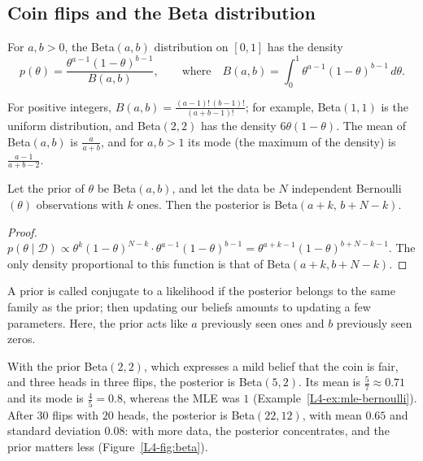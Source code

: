 \subsection{Coin flips and the Beta distribution}

\begin{definition}\label{L4-def:beta}
    For $a, b > 0$, the Beta$(a, b)$ distribution on $[0, 1]$ has the density
    \[p(\theta) = \frac{\theta^{a-1}(1 - \theta)^{b-1}}{B(a, b)}, \qquad \text{where} \quad B(a, b) = \int_0^1 \theta^{a-1}(1 - \theta)^{b-1} \, d\theta.\]
\end{definition}

For positive integers, $B(a, b) = \frac{(a - 1)!\,(b - 1)!}{(a + b - 1)!}$; for example, Beta$(1, 1)$ is the uniform distribution, and Beta$(2, 2)$ has the density $6\theta(1 - \theta)$. The mean of Beta$(a, b)$ is $\frac{a}{a + b}$, and for $a, b > 1$ its mode (the maximum of the density) is $\frac{a - 1}{a + b - 2}$.

\begin{theorem}\label{L4-thm:beta-bernoulli}
    Let the prior of $\theta$ be Beta$(a, b)$, and let the data be $N$ independent Bernoulli$(\theta)$ observations with $k$ ones. Then the posterior is Beta$(a + k, \, b + N - k)$.
\end{theorem}

\begin{proof}
    $p(\theta \mid \mathcal{D}) \propto \theta^k(1 - \theta)^{N-k} \cdot \theta^{a-1}(1 - \theta)^{b-1} = \theta^{a + k - 1}(1 - \theta)^{b + N - k - 1}$. The only density proportional to this function is that of Beta$(a + k, b + N - k)$.
\end{proof}

A prior is called conjugate to a likelihood if the posterior belongs to the same family as the prior; then updating our beliefs amounts to updating a few parameters. Here, the prior acts like $a$ previously seen ones and $b$ previously seen zeros.

\begin{example}\label{L4-ex:beta-coin}
    With the prior Beta$(2, 2)$, which expresses a mild belief that the coin is fair, and three heads in three flips, the posterior is Beta$(5, 2)$. Its mean is $\frac{5}{7} \approx 0.71$ and its mode is $\frac{4}{5} = 0.8$, whereas the MLE was $1$ (Example~\ref{L4-ex:mle-bernoulli}). After $30$ flips with $20$ heads, the posterior is Beta$(22, 12)$, with mean $0.65$ and standard deviation $0.08$: with more data, the posterior concentrates, and the prior matters less (Figure~\ref{L4-fig:beta}).
\end{example}

